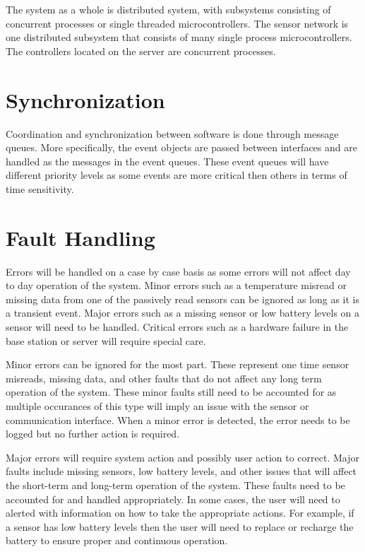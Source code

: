 \documentclass{report}
\begin{document}
The system as a whole is distributed system, with subsystems consisting of
concurrent processes or single threaded microcontrollers. The sensor network is
one distributed subsystem that consists of many single process
microcontrollers. The controllers located on the server are concurrent
processes.


\section{Synchronization}

Coordination and synchronization between software is done through message
queues. More specifically, the event objects are passed between interfaces and
are handled as the messages in the event queues. These event queues will
have different priority levels as some events are more critical then others in
terms of time sensitivity. 

\section{Fault Handling}
Errors will be handled on a case by case basis as some errors will not affect
day to day operation of the system. Minor errors such as a temperature misread
or missing data from one of the passively read sensors can be ignored as long
as it is a transient event. Major errors such as a missing sensor or low
battery levels on a sensor will need to be handled. Critical errors such as a
hardware failure in the base station or server will require special care.

Minor errors can be ignored for the most part. These represent one time sensor
misreads, missing data, and other faults that do not affect any long term
operation of the system. These minor faults still need to be accounted for as
multiple occurances of this type will imply an issue with the sensor or
communication interface. When a minor error is detected, the error needs to be
logged but no further action is required.

Major errors will require system action and possibly user action to correct.
Major faults include missing sensors, low battery levels, and other issues that
will affect the short-term and long-term operation of the system. These faults
need to be accounted for and handled appropriately. In some cases, the user
will need to alerted with information on how to take the appropriate actions.
For example, if a sensor has low battery levels then the user will need to
replace or recharge the battery to ensure proper and continuous operation.
\end{document}

